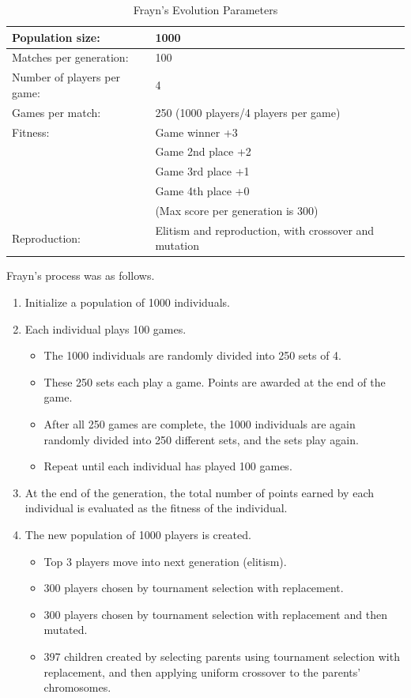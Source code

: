 \begin{table}[ht]
\caption{Frayn's Evolution Parameters}
\begin{center}
\begin{tabular}{ | l | l | }
  \hline                        
  Population size: & 1000 \\ \hline
  Matches per generation: & 100 \\ \hline
  Number of players per game: & 4 \\ \hline
  Games per match: & 250 (1000 players/4 players per game) \\ \hline
  Fitness: & Game winner	+3 \\
  & Game 2nd place	+2 \\
  & Game 3rd place	+1 \\
  & Game 4th place	+0 \\
  & (Max score per generation is 300) \\ \hline
  Reproduction: & Elitism and reproduction, with crossover and mutation \\ \hline  
\end{tabular}
\label{table-fraynparams}
\end{center}
\end{table}

Frayn's process was as follows. 

\begin{enumerate}
  \item Initialize a population of 1000 individuals.
  \item Each individual plays 100 games.
  
  \begin {itemize}
    \item The 1000  individuals are randomly divided into 250 sets of 4.
    \item These 250 sets each play a game. Points are awarded at the end of the
    game.
    \item After all 250 games are complete, the 1000 individuals are again
    randomly divided into 250 different sets, and the sets play again.
    \item Repeat until each individual has played 100 games.
  \end{itemize}
  
  \item At the end of the generation, the total number of points earned by each
  individual is evaluated as the fitness of the individual.
  \item The new population of 1000 players is created.
  \begin{itemize}
    \item Top 3 players move into next generation (elitism).
    \item 300 players chosen by tournament selection with replacement.
    \item 300 players chosen by tournament selection with replacement and then
    mutated.
    \item 397 children created by selecting parents using tournament selection
    with replacement, and then applying uniform crossover to the parents'
    chromosomes.
  \end {itemize}
\end{enumerate}

